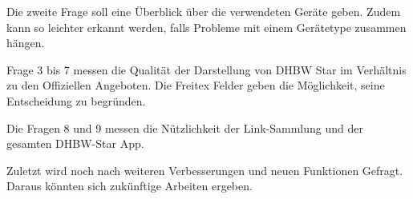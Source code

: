Die zweite Frage soll eine Überblick über die verwendeten Geräte geben. Zudem kann so leichter erkannt werden, falls Probleme mit einem Gerätetype zusammen hängen.

Frage 3 bis 7 messen die Qualität der Darstellung von DHBW Star im Verhältnis zu den Offiziellen Angeboten. Die Freitex Felder geben die Möglichkeit, seine Entscheidung zu begründen.

Die Fragen 8 und 9 messen die Nützlichkeit der Link-Sammlung und der gesamten DHBW-Star App.

Zuletzt wird noch nach weiteren Verbesserungen und neuen Funktionen Gefragt. Daraus könnten sich zukünftige Arbeiten ergeben.


 
